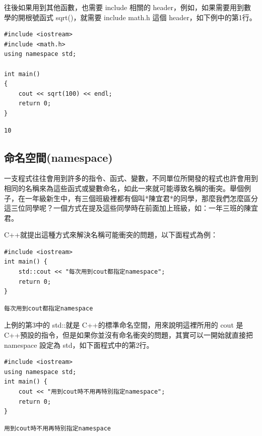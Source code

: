 \documentclass[12pt,a4paper]{article}
\begin{document}
往後如果用到其他函數，也需要 include 相關的 header，例如，如果需要用到數學的開根號函式 sqrt()，就需要 include math.h 這個 header，如下例中的第1行。
\lstset{breaklines=true,language=cpp,label= ,caption= ,captionpos=b,firstnumber=1,numbers=left}
\begin{lstlisting}
#include <iostream>
#include <math.h>
using namespace std;

int main()
{
    cout << sqrt(100) << endl;
    return 0;
}

\end{lstlisting}

\begin{verbatim}
10
\end{verbatim}
\subsection{命名空間(namespace)}
\label{sec:org524da2e}
一支程式往往會用到許多的指令、函式、變數，不同單位所開發的程式也許會用到相同的名稱來為這些函式或變數命名，如此一來就可能導致名稱的衝突。舉個例子，在一年級新生中，有三個班級裡都有個叫*陳宜君*的同學，那麼我們怎麼區分這三位同學呢？一個方式在提及這些同學時在前面加上班級，如：一年三班的陳宜君。

C++就提出這種方式來解決名稱可能衝突的問題，以下面程式為例：
\lstset{breaklines=true,language=cpp,label= ,caption= ,captionpos=b,firstnumber=1,numbers=left}
\begin{lstlisting}
#include <iostream>
int main() {
    std::cout << "每次用到cout都指定namespace";
    return 0;
}
\end{lstlisting}

\begin{verbatim}
每次用到cout都指定namespace
\end{verbatim}


上例的第3中的 std::就是 C++的標準命名空間，用來說明這裡所用的 cout 是 C++預設的指令，但是如果你並沒有命名衝突的問題，其實可以一開始就直接把 namespace 設定為 std，如下面程式中的第2行。
\lstset{breaklines=true,language=cpp,label= ,caption= ,captionpos=b,firstnumber=1,numbers=left}
\begin{lstlisting}
#include <iostream>
using namespace std;
int main() {
    cout << "用到cout時不用再特別指定namespace";
    return 0;
}
\end{lstlisting}

\begin{verbatim}
用到cout時不用再特別指定namespace
\end{verbatim}
\end{document}
